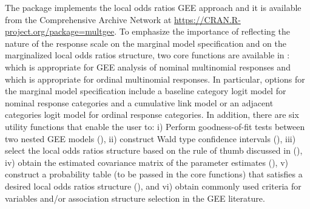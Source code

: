 \documentclass[
]{jss}
\begin{document}
The  \citep{RCoreTeam2013} package  implements
the local odds ratios GEE approach and it is available from the
Comprehensive  Archive Network at
\url{https://CRAN.R-project.org/package=multgee}. To emphasize the
importance of reflecting the nature of the response scale on the
marginal model specification and on the marginalized local odds ratios
structure, two core functions are available in :
 which is appropriate for GEE analysis of nominal
multinomial responses and  which is appropriate for
ordinal multinomial responses. In particular, options for the marginal
model specification include a baseline category logit model for nominal
response categories and a cumulative link model or an adjacent
categories logit model for ordinal response categories. In addition,
there are six utility functions that enable the user to: i) Perform
goodness-of-fit tests between two nested GEE models (), ii)
construct Wald type confidence intervals (), iii) select
the local odds ratios structure based on the rule of thumb discussed in
\citet{Touloumis2012} (), iv) obtain the estimated
covariance matrix of the parameter estimates (), v) construct
a probability table (to be passed in the core functions) that satisfies
a desired local odds ratios structure (), and vi) obtain
commonly used criteria for variables and/or association structure
selection in the GEE literature.
\end{document}
